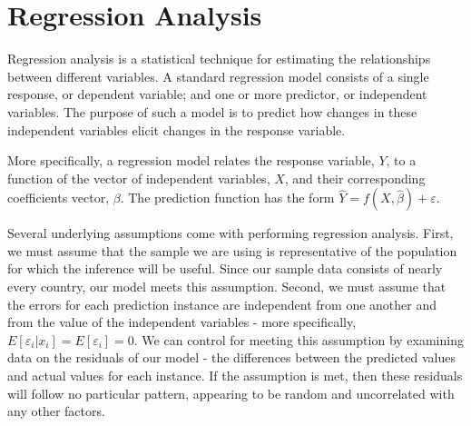 \documentclass[oneside,12pt]{report}
\begin{document}
\section*{Regression Analysis}

Regression analysis is a statistical technique for estimating the relationships between different variables. A standard regression model consists of a single response, or dependent variable; and one or more predictor, or independent variables. The purpose of such a model is to predict how changes in these independent variables elicit changes in the response variable.

More specifically, a regression model relates the response variable, \begin{math}Y\end{math}, to a function of the vector of independent variables, \begin{math}X\end{math}, and their corresponding coefficients vector, \begin{math}\beta\end{math}. The prediction function has the form \begin{math}\widehat{Y} = f(X,\hat\beta) + \varepsilon\end{math}.

Several underlying assumptions come with performing regression analysis. First, we must assume that the sample we are using is representative of the population for which the inference will be useful. Since our sample data consists of nearly every country, our model meets this assumption. Second, we must assume that the errors for each prediction instance are independent from one another and from the value of the independent variables - more specifically, \begin{math}E[\varepsilon_i|x_i] = E[\varepsilon_i] = 0\end{math}. We can control for meeting this assumption by examining data on the residuals of our model - the differences between the predicted values and actual values for each instance. If the assumption is met, then these residuals will follow no particular pattern, appearing to be random and uncorrelated with any other factors.
\end{document}
